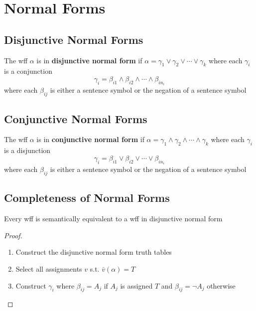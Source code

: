 \section{Normal Forms}
\label{sec:NormalForms}

\subsection{Disjunctive Normal Forms}
\label{sub:DisjunctiveNormalForms}

\begin{definition}
    \label{def:DisjunctiveNormalForm}
    The wff $\alpha$ is in \textbf{disjunctive normal form} if $\alpha=\gamma_1\vee\gamma_2\vee\cdots\vee\gamma_k$ where each $\gamma_i$ is a conjunction
    \[ \gamma_i = \beta_{i1}\wedge\beta_{i2}\wedge\cdots\wedge\beta_{in_i} \]
    where each $\beta_{ij}$ is either a sentence symbol or the negation of a sentence symbol
\end{definition}

\subsection{Conjunctive Normal Forms}
\label{sub:ConjunctiveNormalForms}

\begin{definition}
    \label{def:ConjunctiveNormalForm}
    The wff $\alpha$ is in \textbf{conjunctive normal form} if $\alpha=\gamma_1\wedge\gamma_2\wedge\cdots\wedge\gamma_k$ where each $\gamma_i$ is a disjunction
    \[ \gamma_i = \beta_{i1}\vee\beta_{i2}\vee\cdots\vee\beta_{in_i} \]
    where each $\beta_{ij}$ is either a sentence symbol or the negation of a sentence symbol
\end{definition}

\subsection{Completeness of Normal Forms}

\begin{theorem}
    \label{thm:CompletenessOfDNF}
    Every wff is semantically equivalent to a wff in disjunctive normal form
\end{theorem}
\begin{proof}
    \begin{enumerate}
        \item Construct the disjunctive normal form truth tables
        \item Select all assignments $v$ s.t. $\bar{v}(\alpha)=T$
        \item Construct $\gamma_i$ where $\beta_{ij} = A_j$ if $A_j$ is assigned $T$ and $\beta_{ij} = \neg A_j$ otherwise
    \end{enumerate}
\end{proof}

